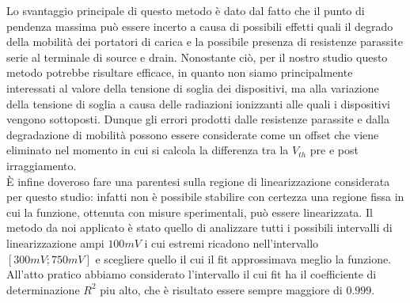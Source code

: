 Lo svantaggio principale di questo metodo è dato dal fatto che il punto di pendenza massima può essere incerto a causa di possibili effetti quali il degrado della mobilità dei portatori di carica e la possibile presenza di resistenze parassite serie al terminale di source e drain.
Nonostante ciò, per il nostro studio questo metodo potrebbe risultare efficace, in quanto non siamo principalmente interessati al valore della tensione di soglia dei dispositivi, ma alla variazione della tensione di soglia a causa delle radiazioni ionizzanti alle quali i dispositivi vengono sottoposti. Dunque gli errori prodotti dalle resistenze parassite e dalla degradazione di mobilità possono essere considerate come un offset che viene eliminato nel momento in cui si calcola la differenza tra la $V_{th}$ pre e post irraggiamento.\\
È infine doveroso fare una parentesi sulla regione di linearizzazione considerata per questo studio: infatti non è possibile stabilire con certezza una regione fissa in cui la funzione, ottenuta con misure sperimentali, può essere linearizzata. Il metodo da noi applicato è stato quello di analizzare tutti i possibili intervalli di linearizzazione ampi $100 mV$ i cui estremi ricadono nell'intervallo $[300 mV ; 750mV]$ e scegliere quello il cui il fit approssimava meglio la funzione. All'atto pratico abbiamo considerato l'intervallo il cui fit ha il coefficiente di determinazione $R^2$ piu alto, che è risultato essere sempre maggiore di $0.999$.



